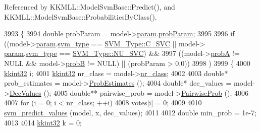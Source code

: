 Referenced by K\+K\+M\+L\+L\+::\+Model\+Svm\+Base\+::\+Predict(), and K\+K\+M\+L\+L\+::\+Model\+Svm\+Base\+::\+Probabilities\+By\+Class().


\begin{DoxyCode}
3993 \{
3994   \textcolor{keywordtype}{double}  probParam = model->\hyperlink{struct_s_v_m289___m_f_s_1_1_svm___model_af44a309facec24212604b219dc411582}{param}.\hyperlink{struct_s_v_m289___m_f_s_1_1svm__parameter_af0c23086f2b9c8373008aac5f396dba0}{probParam};
3995 
3996   \textcolor{keywordflow}{if}  ((model->\hyperlink{struct_s_v_m289___m_f_s_1_1_svm___model_af44a309facec24212604b219dc411582}{param}.\hyperlink{struct_s_v_m289___m_f_s_1_1svm__parameter_a803dee598ce609cc4ccb4fdbfa99cd1b}{svm\_type} == \hyperlink{namespace_s_v_m233_acde4c278f323c82a6b41c27f6f30738aa942f03bda3ae7dbb9e945f161c95ab97}{SVM\_Type::C\_SVC}  ||  model->
      \hyperlink{struct_s_v_m289___m_f_s_1_1_svm___model_af44a309facec24212604b219dc411582}{param}.\hyperlink{struct_s_v_m289___m_f_s_1_1svm__parameter_a803dee598ce609cc4ccb4fdbfa99cd1b}{svm\_type} == \hyperlink{namespace_s_v_m233_acde4c278f323c82a6b41c27f6f30738aa7705bf71b9d3c7169b4d201acb2b30b8}{SVM\_Type::NU\_SVC})  &&  
3997        ((model->\hyperlink{struct_s_v_m289___m_f_s_1_1_svm___model_ae32212566d46d6d9cafbddd37dcfbada}{probA} != NULL  &&  model->\hyperlink{struct_s_v_m289___m_f_s_1_1_svm___model_a4849dabb9dde1adde990980c6c7e1737}{probB} != NULL)  ||  (probParam > 0.0))
3998       )
3999   \{
4000     \hyperlink{namespace_k_k_b_a8fa4952cc84fda1de4bec1fbdd8d5b1b}{kkint32}   i;
4001     \hyperlink{namespace_k_k_b_a8fa4952cc84fda1de4bec1fbdd8d5b1b}{kkint32}   nr\_class = model->\hyperlink{struct_s_v_m289___m_f_s_1_1_svm___model_a0cf11115996187369bc6152f30f6e64c}{nr\_class};
4002 
4003     \textcolor{keywordtype}{double}*  prob\_estimates = model->\hyperlink{struct_s_v_m289___m_f_s_1_1_svm___model_ae167af415613364d71e69cbd4221d4d3}{ProbEstimates} ();
4004     \textcolor{keywordtype}{double}*  dec\_values     = model->\hyperlink{struct_s_v_m289___m_f_s_1_1_svm___model_a534342f92ec4b972b5c1321025223a0f}{DecValues}     ();
4005     \textcolor{keywordtype}{double}** pairwise\_prob  = model->\hyperlink{struct_s_v_m289___m_f_s_1_1_svm___model_a0e4118b531080a8e860b76d4eadcfd80}{PairwiseProb}  ();
4006 
4007     \textcolor{keywordflow}{for}  (i = 0;  i < nr\_class;  ++i)
4008       votes[i] = 0;
4009 
4010     \hyperlink{namespace_s_v_m289___m_f_s_a669dd565b35133cf6dfcc6e8614c2aa5}{svm\_predict\_values} (model, x, dec\_values);
4011 
4012     \textcolor{keywordtype}{double} min\_prob = 1e-7;
4013 
4014     \hyperlink{namespace_k_k_b_a8fa4952cc84fda1de4bec1fbdd8d5b1b}{kkint32} k = 0;

\end{DoxyCode}
